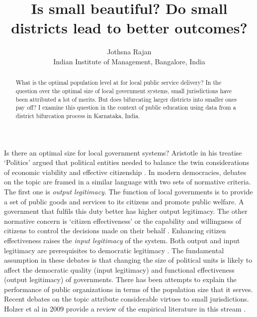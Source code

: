 \documentclass[12pt, a4paper]{article}
\title{Is small beautiful? Do small districts lead to better outcomes?}
\author{Jothsna Rajan \\
	\small{Indian Institute of Management, Bangalore, India}}
\begin{document}
	\maketitle
	\begin{abstract}
		What is the optimal population level at for local public service delivery? In the question over the optimal size of local government systems, small jurisdictions have been attributed a lot of merits. But does bifurcating larger districts into smaller ones pay off? I examine this question in the context of public education using data from a district bifurcation process in Karnataka, India.
	\end{abstract}
\paragraph{} Is there an optimal size for local government systems? Aristotle in his treatise `Politics' argued that political entities needed to balance the twin considerations of economic viability and effective citizenship \parencite{aristotle_politics_1984}. In modern democracies, debates on the topic are framed in a similar language with two sets of normative criteria. The first one is \textit{output legitimacy}. The function of local governments is to provide a set of public goods and services to its citizens and promote public welfare. A government that fulfils this duty better has higher output legitimacy. The other normative concern is `citizen effectiveness' or the capability and willingness of citizens to control the decisions made on their behalf \parencite{dahl_size_1973}. Enhancing citizen effectiveness raises the \textit{input legitimacy} of the system. Both output and input legitimacy are prerequisites to democratic legitimacy \parencite{scharpf_governing_1999}. The fundamental assumption in these debates is that changing the size of political units is likely to affect the democratic quality (input legitimacy) and functional effectiveness (output legitimacy) of governments. There has been attempts to explain the performance of public organizations in terms of the population size that it serves. Recent debates on the topic attribute considerable virtues to small jurisdictions. Holzer et al in 2009 provide a review of the empirical literature in this stream \parencite{holzer2009literature}. 
\end{document}
